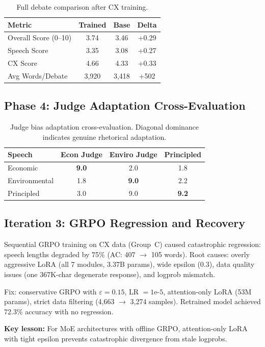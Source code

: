 \begin{table}[h]
\centering
\begin{tabular}{lccc}
\toprule
\textbf{Metric} & \textbf{Trained} & \textbf{Base} & \textbf{Delta} \\
\midrule
Overall Score (0--10) & 3.74 & 3.46 & +0.29 \\
Speech Score & 3.35 & 3.08 & +0.27 \\
CX Score & 4.66 & 4.33 & +0.33 \\
Avg Words/Debate & 3,920 & 3,418 & +502 \\
\bottomrule
\end{tabular}
\caption{Full debate comparison after CX training.}
\end{table}

\subsection{Phase 4: Judge Adaptation Cross-Evaluation}

\begin{table}[h]
\centering
\begin{tabular}{lccc}
\toprule
\textbf{Speech} & \textbf{Econ Judge} & \textbf{Enviro Judge} & \textbf{Principled} \\
\midrule
Economic & \textbf{9.0} & 2.0 & 1.8 \\
Environmental & 1.8 & \textbf{9.0} & 2.2 \\
Principled & 3.0 & 9.0 & \textbf{9.2} \\
\bottomrule
\end{tabular}
\caption{Judge bias adaptation cross-evaluation. Diagonal dominance indicates genuine rhetorical adaptation.}
\end{table}

\subsection{Iteration 3: GRPO Regression and Recovery}

Sequential GRPO training on CX data (Group~C) caused catastrophic regression:
speech lengths degraded by 75\% (AC: 407 $\rightarrow$ 105 words). Root causes:
overly aggressive LoRA (all 7 modules, 3.37B params), wide epsilon (0.3),
data quality issues (one 367K-char degenerate response), and logprob mismatch.

Fix: conservative GRPO with $\varepsilon = 0.15$, LR $= 1\text{e-}5$,
attention-only LoRA (53M params), strict data filtering (4,663 $\rightarrow$ 3,274
samples). Retrained model achieved 72.3\% accuracy with no regression.

\textbf{Key lesson:} For MoE architectures with offline GRPO, attention-only
LoRA with tight epsilon prevents catastrophic divergence from stale logprobs.
